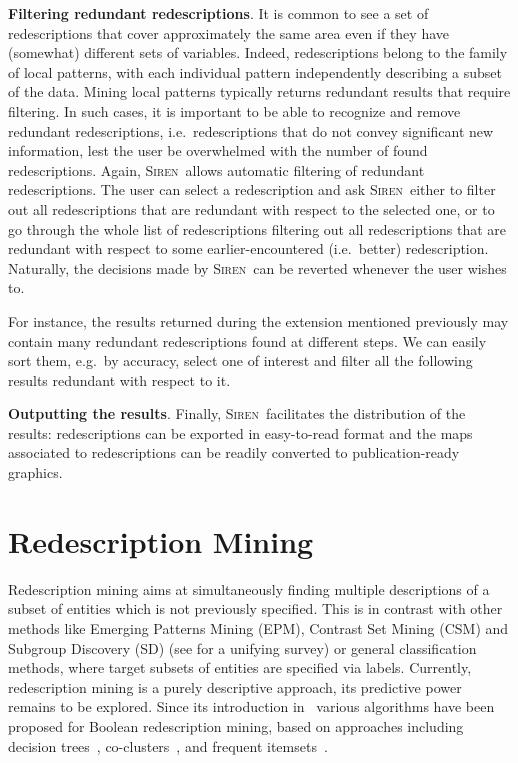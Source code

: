 \documentclass{llncs}
\newcommand{\prg}[1]{\textbf{#1}.}
\newcommand{\Siren}{\textsc{Siren}}
\begin{document}
\prg{Filtering redundant redescriptions}
\label{sec:filt-redund-redescr}
It is common to see a set of redescriptions that cover approximately
the same area even if they have (somewhat) different sets of
variables.  Indeed, redescriptions belong to the family of local
patterns, with each individual pattern independently describing a
subset of the data. Mining local patterns typically returns redundant
results that require filtering.  In such cases, it is important to be
able to recognize and remove redundant redescriptions, i.e.\
redescriptions that do not convey significant new information, lest
the user be overwhelmed with the number of found
redescriptions. Again, \Siren\ allows automatic filtering of redundant
redescriptions. The user can select a redescription and ask
\Siren\ either to filter out all redescriptions that are redundant
with respect to the selected one, or to go through the whole list of
redescriptions filtering out all redescriptions that are redundant
with respect to some earlier-encountered (i.e.\ better)
redescription. Naturally, the decisions made by
\Siren\ can be reverted whenever the user wishes to.

For instance, the results returned during the extension
mentioned previously may contain many redundant redescriptions found
at different steps. We can easily sort them, e.g.\ by accuracy, select
one of interest and filter all the following results redundant with respect to it.


\prg{Outputting the results}
\label{sec:outputting-results}
Finally, \Siren\ facilitates the distribution of the results:
redescriptions can be exported in easy-to-read format and the
maps associated to redescriptions can be readily converted to
publication-ready graphics. 

\section{Redescription Mining}
\label{sec:redescription-mining}
Redescription mining aims at simultaneously finding multiple
descriptions of a subset of entities which is not previously
specified.  This is in contrast with other methods like Emerging
Patterns Mining (EPM), Contrast Set Mining (CSM) and Subgroup Discovery
(SD) (see \cite{kralj09supervised} for a unifying survey) or general
classification methods, where target subsets of entities are specified
via labels.  Currently, redescription mining is a purely descriptive
approach, its predictive power remains to be explored.  Since its
introduction in~\cite{ramakrishnan04turning} various algorithms have
been proposed for Boolean redescription mining, based on approaches
including decision
trees~\cite{ramakrishnan04turning,kumar07redescription},
co-clusters~\cite{parida05redescription}, and frequent
itemsets~\cite{gallo08finding}.
\end{document}
